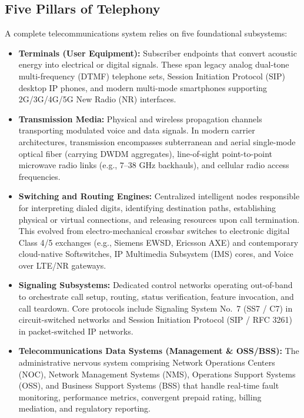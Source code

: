 \documentclass[12pt,a4paper]{report}
\begin{document}
\subsection{Five Pillars of Telephony}
A complete telecommunications system relies on five foundational subsystems:
\begin{itemize}
    \item \textbf{Terminals (User Equipment):} Subscriber endpoints that convert acoustic energy into electrical or digital signals. These span legacy analog dual-tone multi-frequency (DTMF) telephone sets, Session Initiation Protocol (SIP) desktop IP phones, and modern multi-mode smartphones supporting 2G/3G/4G/5G New Radio (NR) interfaces.
    \item \textbf{Transmission Media:} Physical and wireless propagation channels transporting modulated voice and data signals. In modern carrier architectures, transmission encompasses subterranean and aerial single-mode optical fiber (carrying DWDM aggregates), line-of-sight point-to-point microwave radio links (e.g., $7\text{--}38\text{ GHz}$ backhauls), and cellular radio access frequencies.
    \item \textbf{Switching and Routing Engines:} Centralized intelligent nodes responsible for interpreting dialed digits, identifying destination paths, establishing physical or virtual connections, and releasing resources upon call termination. This evolved from electro-mechanical crossbar switches to electronic digital Class 4/5 exchanges (e.g., Siemens EWSD, Ericsson AXE) and contemporary cloud-native Softswitches, IP Multimedia Subsystem (IMS) cores, and Voice over LTE/NR gateways.
    \item \textbf{Signaling Subsystems:} Dedicated control networks operating out-of-band to orchestrate call setup, routing, status verification, feature invocation, and call teardown. Core protocols include Signaling System No.~7 (SS7 / C7) in circuit-switched networks and Session Initiation Protocol (SIP / RFC 3261) in packet-switched IP networks.
    \item \textbf{Telecommunications Data Systems (Management \& OSS/BSS):} The administrative nervous system comprising Network Operations Centers (NOC), Network Management Systems (NMS), Operations Support Systems (OSS), and Business Support Systems (BSS) that handle real-time fault monitoring, performance metrics, convergent prepaid rating, billing mediation, and regulatory reporting.
\end{itemize}
\end{document}
